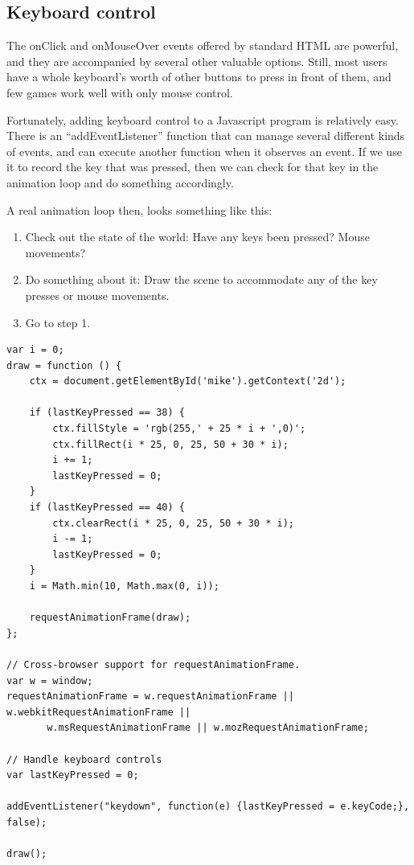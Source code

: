\documentclass[11pt]{article}
\begin{document}
\subsection{Keyboard control}
\label{keyboard-control}

The onClick and onMouseOver events offered by standard HTML are
powerful, and they are accompanied by several other valuable options.
Still, most users have a whole keyboard's worth of other buttons to
press in front of them, and few games work well with only mouse
control.

Fortunately, adding keyboard control to a Javascript program
is relatively easy.  There is an ``addEventListener'' function that
can manage several different kinds of events, and can execute another
function when it observes an event.  If we use it to record the key
that was pressed, then we can check for that key in the animation loop
and do something accordingly.

A real animation loop then, looks something like this:

\begin{enumerate}

\item Check out the state of the world:  Have any keys been pressed?
  Mouse movements?

\item Do something about it:  Draw the scene to accommodate any of the
  key presses or mouse movements.

\item Go to step 1.
\end{enumerate}



\begin{verbatim}
var i = 0;
draw = function () {
    ctx = document.getElementById('mike').getContext('2d');

    if (lastKeyPressed == 38) {
        ctx.fillStyle = 'rgb(255,' + 25 * i + ',0)';
        ctx.fillRect(i * 25, 0, 25, 50 + 30 * i);
        i += 1;
        lastKeyPressed = 0;
    }
    if (lastKeyPressed == 40) {
        ctx.clearRect(i * 25, 0, 25, 50 + 30 * i);
        i -= 1;
        lastKeyPressed = 0;
    }
    i = Math.min(10, Math.max(0, i));

    requestAnimationFrame(draw);
};

// Cross-browser support for requestAnimationFrame.
var w = window;
requestAnimationFrame = w.requestAnimationFrame || w.webkitRequestAnimationFrame ||
       w.msRequestAnimationFrame || w.mozRequestAnimationFrame;

// Handle keyboard controls
var lastKeyPressed = 0;

addEventListener("keydown", function(e) {lastKeyPressed = e.keyCode;}, false);

draw();
\end{verbatim}
\end{document}
